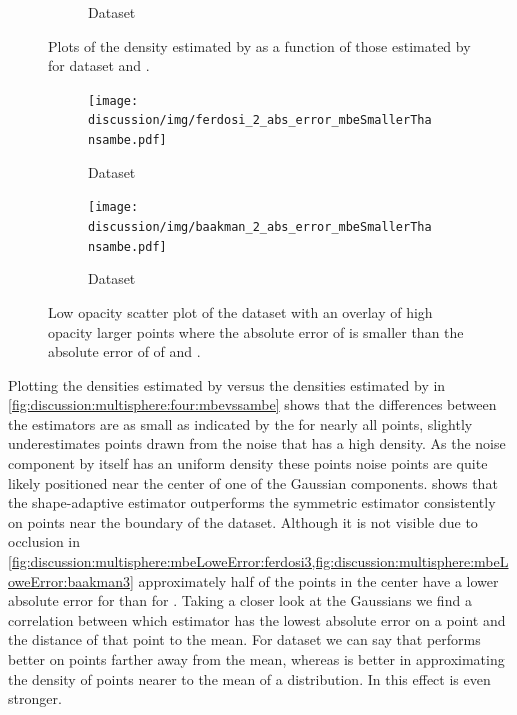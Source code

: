 \begin{figure}
\begin{subfigure}{0.23\textwidth}
			\caption{Dataset \baakmanTwo}
			\label{fig:discussion:multisphere:mbevssambe:baakmanTwo}
		\end{subfigure}	
		\caption{Plots of the density estimated by \sambe as a function of those estimated by \mbe for dataset %
			\ferdosiTwo and %
			\baakmanTwo.
		}
		\label{fig:discussion:multisphere:two:mbevssambe}
	\end{figure}

	\begin{figure}
		\centering
		\begin{subfigure}{0.23\textwidth}
			\centering
			\texttt{[image: discussion/img/ferdosi\_2\_abs\_error\_mbeSmallerThansambe.pdf]}
			\caption{Dataset \ferdosiTwo}
			\label{fig:discussion:multisphere:mbeLoweError:ferdosi2}
		\end{subfigure}
		\begin{subfigure}{0.23\textwidth}
			\centering
			\texttt{[image: discussion/img/baakman\_2\_abs\_error\_mbeSmallerThansambe.pdf]}
			\caption{Dataset \baakmanTwo}
			\label{fig:discussion:multisphere:mbeLoweError:baakmanTwo}
		\end{subfigure}	
		\caption{Low opacity scatter plot of the dataset with an overlay of high opacity larger points where the absolute error of \mbe is smaller than the absolute error of \sambe of %
			\ferdosiTwo and %
			\baakmanTwo.
		}
		\label{fig:discussion:multisphere:two:mbeLoweError}
	\end{figure}

	Plotting the densities estimated by \sambe versus the densities estimated by \mbe in \cref{fig:discussion:multisphere:four:mbevssambe} shows that the differences between the estimators are as small as indicated by the \mse for nearly all points, \sambe slightly underestimates points drawn from the noise that has a high density. As the noise component by itself has an uniform density these points noise points are quite likely positioned near the center of one of the Gaussian components.  shows that the shape-adaptive estimator outperforms the symmetric estimator consistently on points near the boundary of the dataset. Although it is not visible due to occlusion in \cref{fig:discussion:multisphere:mbeLoweError:ferdosi3,fig:discussion:multisphere:mbeLoweError:baakman3} approximately half of the points in the center have a lower absolute error for \sambe than for \mbe. Taking a closer look at the Gaussians we find a correlation between which estimator has the lowest absolute error on a point and the distance of that point to the mean. For dataset \ferdosiThree we can say that \sambe performs better on points farther away from the mean, whereas \mbe is better in approximating the density of points nearer to the mean of a distribution. In \baakmanThree this effect is even stronger. 

